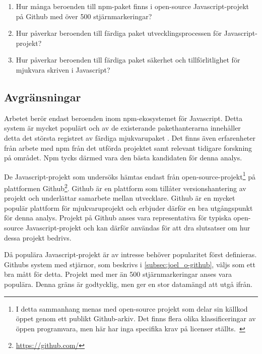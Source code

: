 \begin{enumerate}
  \item\label{joel_o-fs:1} Hur många beroenden till npm-paket finns i open-source Javascript-projekt på Github med över 500 stjärnmarkeringar?

  \item\label{joel_o-fs:2} Hur påverkar beroenden till färdiga paket utvecklingsprocessen för Javascript-projekt?

  \item\label{joel_o-fs:3} Hur påverkar beroenden till färdiga paket säkerhet och tillförlitlighet för mjukvara skriven i Javascript?
\end{enumerate}

\subsection{Avgränsningar}
\label{subsec:joel_o-delimitations}
Arbetet berör endast beroenden inom npm-ekosystemet för Javascript. Detta system är mycket populärt och av de existerande pakethanterarna innehåller detta det största registret av färdiga mjukvarupaket \cite{Decan2018}. Det finns även erfarenheter från arbete med npm från det utförda projektet samt relevant tidigare forskning på området. Npm tycks därmed vara den bästa kandidaten för denna analys.

De Javascript-projekt som undersöks hämtas endast från open-source-projekt\footnote{I detta sammanhang menas med open-source projekt som delar sin källkod öppet genom ett publikt Github-arkiv. Det finns flera olika klassificeringar av öppen programvara, men här har inga specifika krav på licenser ställts.~\cite{what-is-open-source}} på plattformen Github\footnote{\url{https://github.com/}}. Github är en plattform som tillåter versionshantering av projekt och underlättar samarbete mellan utvecklare. Github är en mycket populär plattform för mjukvaruprojekt och erbjuder därför en bra utgångspunkt för denna analys. Projekt på Github anses vara representativa för typiska open-source Javascript-projekt och kan därför användas för att dra slutsatser om hur dessa projekt bedrivs.

Då populära Javascript-projekt är av intresse behöver popularitet först definieras. Githubs system med stjärnor, som beskrivs i \ref{subsec:joel_o-github}, väljs som ett bra mått för detta. Projekt med mer än 500 stjärnmarkeringar anses vara populära. Denna gräns är godtycklig, men ger en stor datamängd att utgå ifrån.
